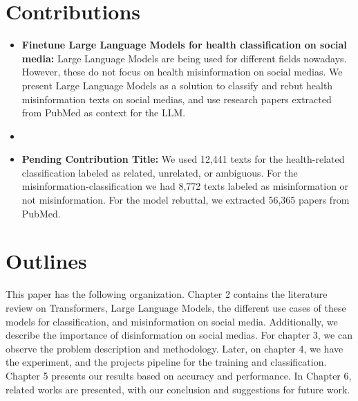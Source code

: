 \section{Contributions}
\noindent
\begin{itemize}
	\item \textbf{Finetune Large Language Models for health classification on social media:} Large Language Models are being used for different fields nowadays. However, these do not focus on health misinformation on social medias. We present Large Language Models as a solution
	to classify and rebut health misinformation texts on social medias, and use research papers extracted from PubMed as context for the LLM.
	\item \textbf{} 
	\item \textbf{Pending Contribution Title:} We used 12,441 texts for the health-related classification labeled as related, unrelated, or ambiguous. For the misinformation-classification we had 8,772 texts labeled as misinformation or not misinformation. For the model rebuttal, we extracted
	56,365 papers from PubMed.
	
\end{itemize}

\section{Outlines}
\noindent
This paper has the following organization. Chapter 2 contains the literature review on Transformers, Large Language Models,
 the different use cases of these models for classification, and misinformation on social media. Additionally, we describe the importance of disinformation on social medias.
For chapter 3, we can observe the problem description and methodology. Later, on chapter 4, we have the experiment, and the projects pipeline
for the training and classification. Chapter 5 presents our results based on accuracy and performance. In Chapter 6, related works
are presented, with our conclusion and suggestions for future work.